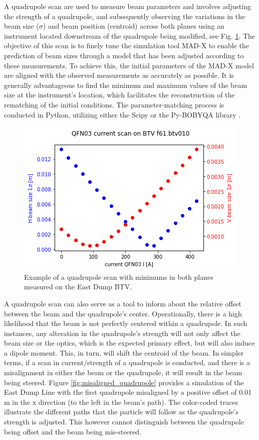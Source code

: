 A quadrupole scan are used to measure beam parameters and involves adjusting the strength of a quadrupole, and subsequently observing the variations in the beam size ($\sigma$) and beam position (centroid) across both planes using an instrument located downstream of the quadrupole being modified, see Fig. \ref{fig:quad_scan_example}. The objective of this scan is to finely tune the simulation tool MAD-X \cite{noauthor_mad_nodate} to enable the prediction of beam sizes through a model that has been adjusted according to these measurements. To achieve this, the initial parameters of the MAD-X model are aligned with the observed measurements as accurately as possible. It is generally advantageous to find the minimum and maximum values of the beam size at the instrument's location, which facilitates the reconstruction of the rematching of the initial conditions. The parameter-matching process is conducted in Python, utilizing either the Scipy or the Py-BOBYQA library \cite{cartis_improving_2019, cartis_escaping_2022}.

\begin{figure}[htbp]
\centering
\includegraphics[width=0.5\linewidth]{03_Empirical_Measurements/images/quadrupole_scan_east_dump.png}
\caption{Example of a quadrupole scan with minimums in both planes measured on the East Dump BTV.}
\label{fig:quad_scan_example}
\end{figure}

A quadrupole scan can also serve as a tool to inform about the relative offset between the beam and the quadrupole's center. Operationally, there is a high likelihood that the beam is not perfectly centered within a quadrupole. In such instances, any alteration in the quadrupole's strength will not only affect the beam size or the optics, which is the expected primary effect, but will also induce a dipole moment. This, in turn, will shift the centroid of the beam. In simpler terms, if a scan in current/strength of a quadrupole is conducted, and there is a misalignment in either the beam or the quadrupole, it will result in the beam being steered. Figure \ref{fig:misaligned_quadrupole} provides a simulation of the East Dump Line with the first quadrupole misaligned by a positive offset of 0.01 m in the x direction (to the left in the beam's path). The color-coded traces illustrate the different paths that the particle will follow as the quadrupole's strength is adjusted. This however cannot distinguish between the quadrupole being offset and the beam being mis-steered.
\\

